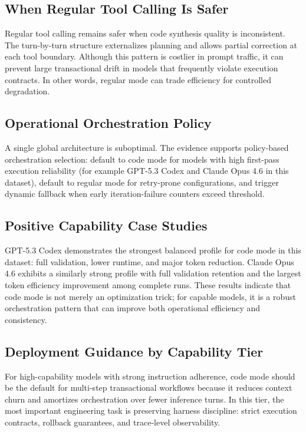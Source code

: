 \documentclass[journal,article,submit,pdftex,moreauthors]{Definitions/mdpi}
\begin{document}
\subsection{When Regular Tool Calling Is Safer}

Regular tool calling remains safer when code synthesis quality is inconsistent. The turn-by-turn structure externalizes planning and allows partial correction at each tool boundary. Although this pattern is costlier in prompt traffic, it can prevent large transactional drift in models that frequently violate execution contracts. In other words, regular mode can trade efficiency for controlled degradation.

\subsection{Operational Orchestration Policy}

A single global architecture is suboptimal. The evidence supports policy-based orchestration selection: default to code mode for models with high first-pass execution reliability (for example GPT-5.3 Codex and Claude Opus 4.6 in this dataset), default to regular mode for retry-prone configurations, and trigger dynamic fallback when early iteration-failure counters exceed threshold.

\subsection{Positive Capability Case Studies}

GPT-5.3 Codex demonstrates the strongest balanced profile for code mode in this dataset: full validation, lower runtime, and major token reduction. Claude Opus 4.6 exhibits a similarly strong profile with full validation retention and the largest token efficiency improvement among complete runs. These results indicate that code mode is not merely an optimization trick; for capable models, it is a robust orchestration pattern that can improve both operational efficiency and consistency.

\subsection{Deployment Guidance by Capability Tier}

For high-capability models with strong instruction adherence, code mode should be the default for multi-step transactional workflows because it reduces context churn and amortizes orchestration over fewer inference turns. In this tier, the most important engineering task is preserving harness discipline: strict execution contracts, rollback guarantees, and trace-level observability.
\end{document}
